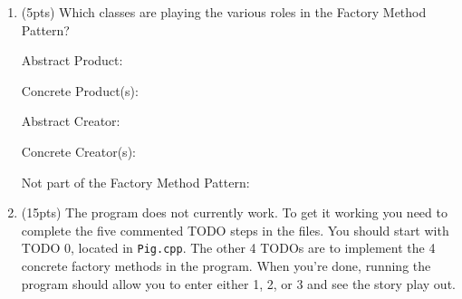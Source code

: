 \documentclass[11pt]{article}
\begin{document}
\begin{enumerate}
\begin{enumerate}
    \vfill
    \vfill

    \item (5pts) Which classes are playing the various roles in the Factory Method Pattern?
    \medskip 

    Abstract Product:
    \medskip 

    Concrete Product(s):
    \medskip

    Abstract Creator:
    \medskip

    Concrete Creator(s):
    \medskip

    Not part of the Factory Method Pattern:
    \medskip

    \item (15pts) The program does not currently work. To get it working you need to complete the five commented TODO steps in the files. You should start with TODO 0, located in \texttt{Pig.cpp}. The other 4 TODOs are to implement the 4 concrete factory methods in the program. When you're done, running the program should allow you to enter either 1, 2, or 3 and see the story play out. 

  \end{enumerate}

\end{enumerate}
\end{document}
